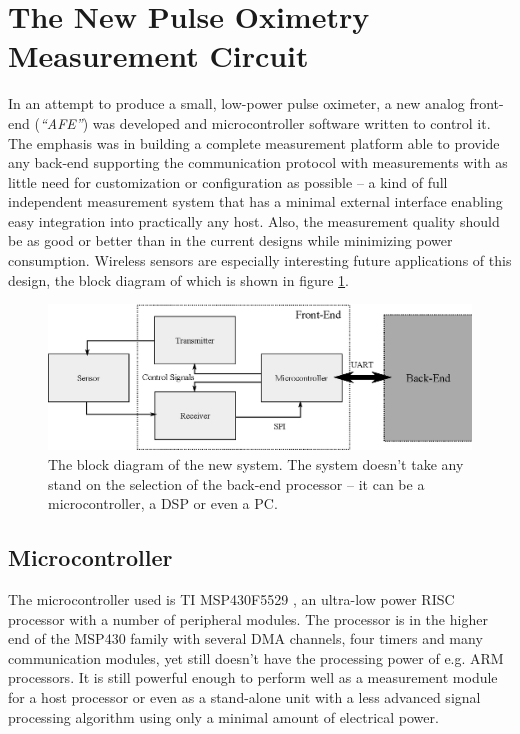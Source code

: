 \clearpage
\section{The New Pulse Oximetry Measurement Circuit}\label{section:integrated_afe}

In an attempt to produce a small, low-power pulse oximeter, a new analog front-end (\textit{``AFE''}) was developed and microcontroller software written to control it. The emphasis was in building a complete measurement platform able to provide any back-end supporting the communication protocol with measurements with as little need for customization or configuration as possible -- a kind of full independent measurement system that has a minimal external interface enabling easy integration into practically any host. Also, the measurement quality should be as good or better than in the current designs while minimizing power consumption. Wireless sensors are especially interesting future applications of this design, the block diagram of which is shown in figure \ref{fig:ASSP_block_diagram}.

\begin{figure}[htcb]
  \centering\includegraphics[scale=0.8]{kuvat/ASSP_block_diagram.eps}
  \caption{The block diagram of the new system. The system doesn't take any stand on the selection of the back-end processor -- it can be a microcontroller, a DSP or even a PC.}
  \label{fig:ASSP_block_diagram}
\end{figure}

\subsection{Microcontroller}

The microcontroller used is TI MSP430F5529 \cite{MSP430F5529}, an ultra-low power RISC processor with a number of peripheral modules. The processor is in the higher end of the MSP430 family with several DMA channels, four timers and many communication modules, yet still doesn't have the processing power of e.g. ARM processors. It is still powerful enough to perform well as a measurement module for a host processor or even as a stand-alone unit with a less advanced signal processing algorithm using only a minimal amount of electrical power.

